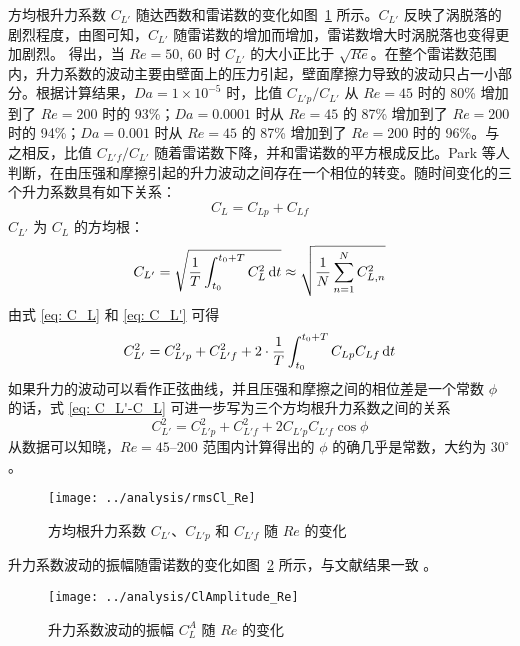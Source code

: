 方均根升力系数 $C_{L'}$ 随达西数和雷诺数的变化如图~\ref{fig: rmsCl} 所示。$C_{L'}$ 反映了涡脱落的剧烈程度，由图可知，$C_{L'}$ 随雷诺数的增加而增加，雷诺数增大时涡脱落也变得更加剧烈。\cite{} 得出，当 $Re=50,\,60$ 时 $C_{L'}$ 的大小正比于 $\sqrt{Re}$。在整个雷诺数范围内，升力系数的波动主要由壁面上的压力引起，壁面摩擦力导致的波动只占一小部分。根据计算结果，$Da=1\times 10^{-5}$ 时，比值 $C_{L'p}/C_{L'}$ 从 $Re=45$ 时的 80\% 增加到了 $Re=200$ 时的 93\%；$Da=0.0001$ 时从 $Re=45$ 的 87\% 增加到了 $Re=200$ 时的 94\%；$Da=0.001$ 时从 $Re=45$ 的 87\% 增加到了 $Re=200$ 时的 96\%。与之相反，比值 $C_{L'f}/C_{L'}$ 随着雷诺数下降，并和雷诺数的平方根成反比。Park 等人 \cite{} 判断，在由压强和摩擦引起的升力波动之间存在一个相位的转变。随时间变化的三个升力系数具有如下关系：
\begin{equation}\label{eq: C_L}
	C_L = C_{Lp} + C_{Lf}
\end{equation}
$C_{L'}$ 为 $C_L$ 的方均根：
\begin{equation}\label{eq: C_L'}
	C_{L'} = \sqrt{\frac{1}{T}\int_{t_0}^{t_0+T}C_L^2\,\mathrm{d} t} \approx
	\sqrt{\frac{1}{N}\sum_{n=1}^N C_{L,n}^2}
\end{equation}
由式 \eqref{eq: C_L} 和 \eqref{eq: C_L'} 可得
\begin{equation}\label{eq: C_L'-C_L}
	C_{L'}^2 = C_{L'p}^2 + C_{L'f}^2 + 2\cdot\frac{1}{T}\int_{t_0}^{t_0+T}C_{Lp}C_{Lf}\,\mathrm{d} t
\end{equation}
如果升力的波动可以看作正弦曲线，并且压强和摩擦之间的相位差是一个常数 $\phi$ 的话，式 \eqref{eq: C_L'-C_L} 可进一步写为三个方均根升力系数之间的关系
\begin{equation}
	C_{L'}^2 = C_{L'p}^2 + C_{L'f}^2 + 2C_{L'p}C_{L'f}\cos\phi
\end{equation}
从数据可以知晓，$Re=45$--$200$ 范围内计算得出的 $\phi$ 的确几乎是常数，大约为 $30^\circ$。

\begin{figure}
	\centering
	\texttt{[image: ../analysis/rmsCl\_Re]}
	\caption{方均根升力系数 $C_{L'}$、$C_{L'p}$ 和 $C_{L'f}$ 随 $Re$ 的变化}
	\label{fig: rmsCl}
\end{figure}

升力系数波动的振幅随雷诺数的变化如图~\ref{fig: ClAmplitude} 所示，与文献结果一致 \cite{Park1998}。

\begin{figure}
	\centering
	\texttt{[image: ../analysis/ClAmplitude\_Re]}
	\caption{升力系数波动的振幅 $C_L^A$ 随 $Re$ 的变化}
	\label{fig: ClAmplitude}
\end{figure}

